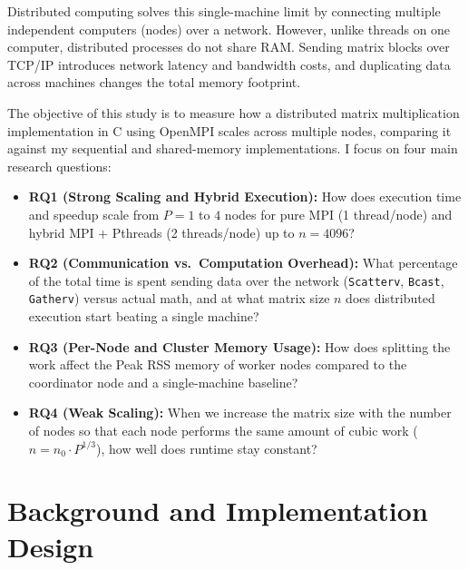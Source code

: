 \documentclass[11pt,a4paper]{article}
\begin{document}
Distributed computing solves this single-machine limit by connecting multiple independent computers (nodes) over a network. However, unlike threads on one computer, distributed processes do not share RAM. Sending matrix blocks over TCP/IP introduces network latency and bandwidth costs, and duplicating data across machines changes the total memory footprint.

The objective of this study is to measure how a distributed matrix multiplication implementation in C using OpenMPI scales across multiple nodes, comparing it against my sequential and shared-memory implementations. I focus on four main research questions:

\begin{itemize}
    \item \textbf{RQ1 (Strong Scaling and Hybrid Execution):} How does execution time and speedup scale from $P = 1$ to $4$ nodes for pure MPI (1 thread/node) and hybrid MPI + Pthreads (2 threads/node) up to $n = 4096$?
    \item \textbf{RQ2 (Communication vs.\ Computation Overhead):} What percentage of the total time is spent sending data over the network (\texttt{Scatterv}, \texttt{Bcast}, \texttt{Gatherv}) versus actual math, and at what matrix size $n$ does distributed execution start beating a single machine?
    \item \textbf{RQ3 (Per-Node and Cluster Memory Usage):} How does splitting the work affect the Peak RSS memory of worker nodes compared to the coordinator node and a single-machine baseline?
    \item \textbf{RQ4 (Weak Scaling):} When we increase the matrix size with the number of nodes so that each node performs the same amount of cubic work ($n = n_0 \cdot P^{1/3}$), how well does runtime stay constant?
\end{itemize}

\section{Background and Implementation Design}
\end{document}
